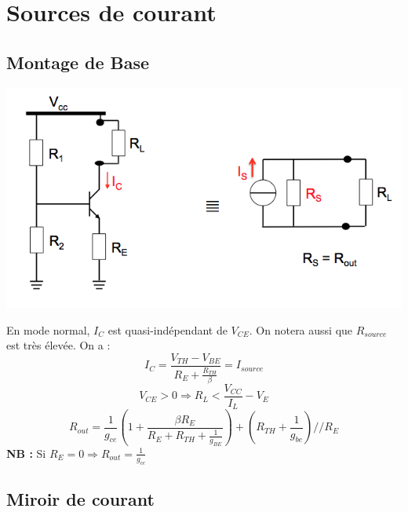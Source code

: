 \documentclass[]{article}
\begin{document}
\section{Sources de courant}
\subsection{Montage de Base}
\includegraphics[scale=0.7]{courant}

En mode normal, $I_C$ est quasi-indépendant de $V_{CE}$. On notera aussi que $R_{source}$ est très élevée.
On a : $$ I_C = \frac{V_{TH} - V_{BE}}{R_E + \frac{R_{TH}}{\beta}} = I_{source}$$
$$ V_{CE} > 0 \Rightarrow R_L < \frac{V_{CC}}{I_L} - V_E $$
$$ R_{out} = \frac{1}{g_{ce}}(1+\frac{\beta R_E}{R_E+ R_{TH}+ \frac{1}{g_{BE}}})+(R_{TH}+\frac{1}{g_{be}})//R_E$$
\textbf{NB :} Si $R_E = 0 \Rightarrow R_{out} = \frac{1}{g_{ce}}$

\subsection{Miroir de courant}
\end{document}
